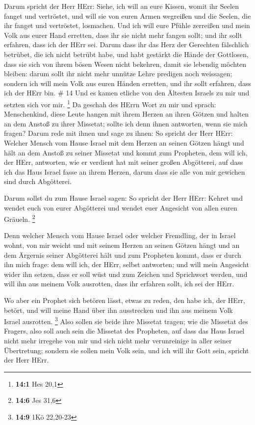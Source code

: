  Darum spricht der Herr HErr: Siehe, ich will an eure
Kissen, womit ihr Seelen fanget und vertröstet, und will sie von euren
Armen wegreißen und die Seelen, die ihr fanget und vertröstet,
losmachen.  Und ich will eure Pfühle zerreißen und mein
Volk aus eurer Hand erretten, dass ihr sie nicht mehr fangen sollt; und
ihr sollt erfahren, dass ich der HErr sei.  Darum dass ihr
das Herz der Gerechten fälschlich betrübet, die ich nicht betrübt habe,
und habt gestärkt die Hände der Gottlosen, dass sie sich von ihrem bösen
Wesen nicht bekehren, damit sie lebendig möchten bleiben: 
darum sollt ihr nicht mehr unnütze Lehre predigen noch weissagen;
sondern ich will mein Volk aus euren Händen erretten, und ihr sollt
erfahren, dass ich der HErr bin. \# 14  Und es kamen etliche
von den Ältesten Israels zu mir und setzten sich vor mir. \footnote{\textbf{14:1}
  Hes 20,1}  Da geschah des HErrn Wort zu mir und sprach:
 Menschenkind, diese Leute hangen mit ihrem Herzen an ihren
Götzen und halten an dem Anstoß zu ihrer Missetat; sollte ich denn ihnen
antworten, wenn sie mich fragen?  Darum rede mit ihnen und
sage zu ihnen: So spricht der Herr HErr: Welcher Mensch vom Hause Israel
mit dem Herzen an seinen Götzen hängt und hält an dem Anstoß zu seiner
Missetat und kommt zum Propheten, dem will ich, der HErr, antworten, wie
er verdient hat mit seiner großen Abgötterei,  auf dass ich
das Haus Israel fasse an ihrem Herzen, darum dass sie alle von mir
gewichen sind durch Abgötterei.

 Darum sollst du zum Hause Israel sagen: So spricht der Herr
HErr: Kehret und wendet euch von eurer Abgötterei und wendet euer
Angesicht von allen euren Gräueln. \footnote{\textbf{14:6} Jes 31,6}

 Denn welcher Mensch vom Hause Israel oder welcher
Fremdling, der in Israel wohnt, von mir weicht und mit seinem Herzen an
seinen Götzen hängt und an dem Ärgernis seiner Abgötterei hält und zum
Propheten kommt, dass er durch ihn mich frage: dem will ich, der HErr,
selbst antworten;  und will mein Angesicht wider ihn setzen,
dass er soll wüst und zum Zeichen und Sprichwort werden, und will ihn
aus meinem Volk ausrotten, dass ihr erfahren sollt, ich sei der HErr.

 Wo aber ein Prophet sich betören lässt, etwas zu reden, den
habe ich, der HErr, betört, und will meine Hand über ihn ausstrecken und
ihn aus meinem Volk Israel ausrotten. \footnote{\textbf{14:9} 1Kö
  22,20-23}  Also sollen sie beide ihre Missetat tragen;
wie die Missetat des Fragers, also soll auch sein die Missetat des
Propheten,  auf dass das Haus Israel nicht mehr irregehe
von mir und sich nicht mehr verunreinige in aller seiner Übertretung;
sondern sie sollen mein Volk sein, und ich will ihr Gott sein, spricht
der Herr HErr.

